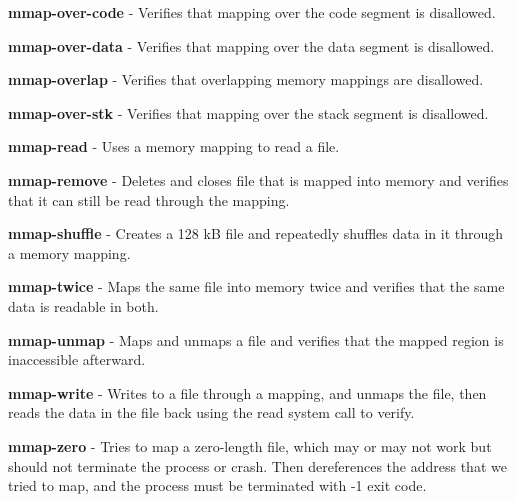 \textbf{mmap-over-code} - Verifies that mapping over the code segment is disallowed.


\textbf{mmap-over-data} - Verifies that mapping over the data segment is disallowed.


\textbf{mmap-overlap} - Verifies that overlapping memory mappings are disallowed.


\textbf{mmap-over-stk} - Verifies that mapping over the stack segment is disallowed.


\textbf{mmap-read} - Uses a memory mapping to read a file.


\textbf{mmap-remove} - Deletes and closes file that is mapped into memory and verifies that it can still be read through the mapping.


\textbf{mmap-shuffle} - Creates a 128 kB file and repeatedly shuffles data in it through a memory mapping.


\textbf{mmap-twice} - Maps the same file into memory twice and verifies that the same data is readable in both.


\textbf{mmap-unmap} - Maps and unmaps a file and verifies that the mapped region is inaccessible afterward.


\textbf{mmap-write} - Writes to a file through a mapping, and unmaps the file, then reads the data in the file back using the read system call to verify.


\textbf{mmap-zero} - Tries to map a zero-length file, which may or may not work but  should not terminate the process or crash.  Then dereferences the address that we tried to map, and the process must be terminated with -1 exit code. 









	

